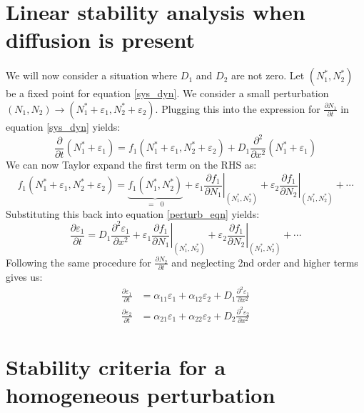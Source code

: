\section{Linear stability analysis when diffusion is present}
We will now consider a situation where $D_1$ and $D_2$ are not zero. Let $(N_{1}^*,N_{2}^*)$ be a fixed point for equation \eqref{sys_dyn}. We consider a small perturbation  $(N_1,N_2) \to (N_{1}^* + \varepsilon_1,N_{2}^* + \varepsilon_2)$. Plugging this into the expression for $\frac{\partial N_1}{\partial t}$ in equation \eqref{sys_dyn} yields:
\begin{equation}
	\label{perturb_eqn}
	\frac{\partial}{\partial t}(N_{1}^* + \varepsilon_1) = f_1(N_{1}^* + \varepsilon_1,N_{2}^* + \varepsilon_2) + D_1\frac{\partial^2}{\partial x^2}(N_{1}^* + \varepsilon_1)
\end{equation}
We can now Taylor expand the first term on the RHS as:
\begin{equation*}
	f_1(N_{1}^* + \varepsilon_1,N_{2}^* + \varepsilon_2) = \underbrace{f_1(N_{1}^*,N_{2}^*)}_{=\text{ }0} + \varepsilon_1\left.\frac{\partial f_1}{\partial N_1}\right\vert_{(N_{1}^*,N_{2}^*)} + \varepsilon_2\left.\frac{\partial f_1}{\partial N_2}\right\vert_{(N_{1}^*,N_{2}^*)} + \cdots
\end{equation*}
Substituting this back into equation \eqref{perturb_eqn} yields:
\begin{equation*}
	\frac{\partial \varepsilon_1}{\partial t} = D_1\frac{\partial^2\varepsilon_1}{\partial x^2} + \varepsilon_1\left.\frac{\partial f_1}{\partial N_1}\right\vert_{(N_{1}^*,N_{2}^*)} + \varepsilon_2\left.\frac{\partial f_1}{\partial N_2}\right\vert_{(N_{1}^*,N_{2}^*)} + \cdots
\end{equation*}
Following the same procedure for $\frac{\partial N_2}{\partial t}$ and neglecting 2nd order and higher terms gives us:
\begin{equation}
	\label{RDE_stability}
	\begin{aligned}
		\frac{\partial \varepsilon_1}{\partial t} &=  \alpha_{11}\varepsilon_1 + \alpha_{12}\varepsilon_2 + D_1\frac{\partial^2\varepsilon_1}{\partial x^2}\\
		\frac{\partial \varepsilon_2}{\partial t} &=  \alpha_{21}\varepsilon_1 + \alpha_{22}\varepsilon_2 + D_2\frac{\partial^2\varepsilon_2}{\partial x^2}
	\end{aligned}
\end{equation}
\bigskip
\section{Stability criteria for a homogeneous perturbation}

